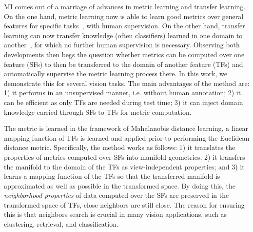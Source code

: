 MI comes out of a marriage of advances in metric learning and transfer
learning. On the one hand, metric learning now is able to learn good
metrics over general features for specific tasks~\citep{metric:survey:12}, with human
supervision.
On the other hand, transfer learning can now transfer knowledge (often
classifiers) learned in one domain to
another~\citep{tl:survey}, for which no further human supervision is
necessary. Observing both developments then begs the question whether
metrics can be computed over one feature (\ie SFs) to then be
transferred to the domain of another feature (\ie TFs) and
automatically supervise the metric learning process there. 
In this work, we demonstrate this for several vision tasks. The main
advantages of the method are: 1) it performs in an unsupervised
manner, i.e. without human annotation; 2) it can be efficient as only
TFs are needed during test time; 3) it can inject domain knowledge
carried through SFs to TFs for metric computation.  

The metric is learned in the framework of Mahalanobis distance
learning, \ie a linear mapping function of TFs is learned and applied
prior to performing the Euclidean distance metric. Specifically, the
method works as follows: 1) it translates the properties of metrics
computed over SFs into manifold geometries; 2) it transfers the
manifold to the domain of the TFs as view-independent properties; and
3) it learns a mapping function of the TFs so that the transferred
manifold is approximated as well as possible in the transformed
space. By doing this, the \emph{neighborhood properties} of data computed
over the SFs are preserved in the transformed space of TFs, \ie close
neighbors are still close. The reason for ensuring this is that
neighbors search is crucial in many vision applications,
such as clustering, retrieval, and classification.


